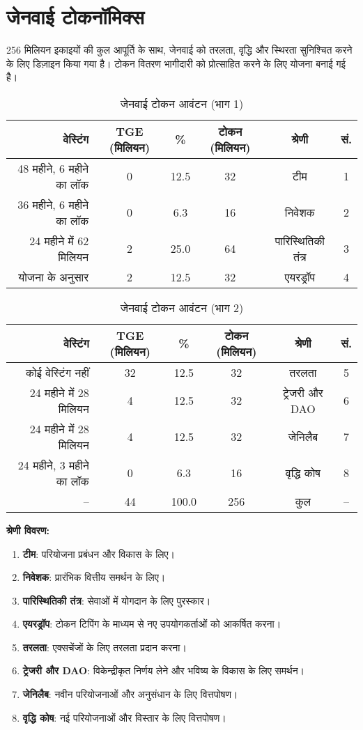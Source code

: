 \documentclass[a4paper,12pt,openany]{book}
\begin{document}
\section*{जेनवाई टोकनॉमिक्स}
256 मिलियन इकाइयों की कुल आपूर्ति के साथ, जेनवाई को तरलता, वृद्धि और स्थिरता सुनिश्चित करने के लिए डिज़ाइन किया गया है। टोकन वितरण भागीदारी को प्रोत्साहित करने के लिए योजना बनाई गई है।

\begin{table}[h]
\centering
\caption{जेनवाई टोकन आवंटन (भाग 1)}
\small
\begin{tabular}{r c c c c c}
\hline
\textbf{वेस्टिंग} & \textbf{TGE (मिलियन)} & \textbf{\%} & \textbf{टोकन (मिलियन)} & \textbf{श्रेणी} & \textbf{सं.} \\
\hline
48 महीने, 6 महीने का लॉक & 0 & 12.5 & 32 & टीम & 1 \\
36 महीने, 6 महीने का लॉक & 0 & 6.3 & 16 & निवेशक & 2 \\
24 महीने में 62 मिलियन & 2 & 25.0 & 64 & पारिस्थितिकी तंत्र & 3 \\
योजना के अनुसार & 2 & 12.5 & 32 & एयरड्रॉप & 4 \\
\hline
\end{tabular}
\end{table}

\begin{table}[h]
\centering
\caption{जेनवाई टोकन आवंटन (भाग 2)}
\small
\begin{tabular}{r c c c c c}
\hline
\textbf{वेस्टिंग} & \textbf{TGE (मिलियन)} & \textbf{\%} & \textbf{टोकन (मिलियन)} & \textbf{श्रेणी} & \textbf{सं.} \\
\hline
कोई वेस्टिंग नहीं & 32 & 12.5 & 32 & तरलता & 5 \\
24 महीने में 28 मिलियन & 4 & 12.5 & 32 & ट्रेजरी और DAO & 6 \\
24 महीने में 28 मिलियन & 4 & 12.5 & 32 & जेनिलैब & 7 \\
24 महीने, 3 महीने का लॉक & 0 & 6.3 & 16 & वृद्धि कोष & 8 \\
\hline
-- & 44 & 100.0 & 256 & कुल & -- \\
\hline
\end{tabular}
\end{table}

\textbf{श्रेणी विवरण:}
\begin{enumerate}
    \item \textbf{टीम}: परियोजना प्रबंधन और विकास के लिए।
    \item \textbf{निवेशक}: प्रारंभिक वित्तीय समर्थन के लिए।
    \item \textbf{पारिस्थितिकी तंत्र}: सेवाओं में योगदान के लिए पुरस्कार।
    \item \textbf{एयरड्रॉप}: टोकन टिपिंग के माध्यम से नए उपयोगकर्ताओं को आकर्षित करना।
    \item \textbf{तरलता}: एक्सचेंजों के लिए तरलता प्रदान करना।
    \item \textbf{ट्रेजरी और DAO}: विकेन्द्रीकृत निर्णय लेने और भविष्य के विकास के लिए समर्थन।
    \item \textbf{जेनिलैब}: नवीन परियोजनाओं और अनुसंधान के लिए वित्तपोषण।
    \item \textbf{वृद्धि कोष}: नई परियोजनाओं और विस्तार के लिए वित्तपोषण।
\end{enumerate}
\end{document}
